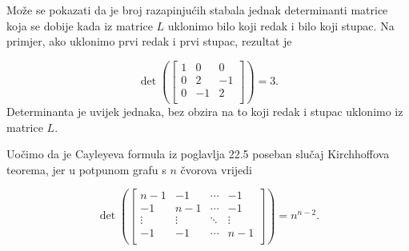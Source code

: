 Može se pokazati da je
broj razapinjućih stabala jednak
determinanti matrice koja se dobije
kada iz matrice $L$ uklonimo bilo koji redak i bilo koji stupac.
Na primjer, ako uklonimo prvi redak
i prvi stupac, rezultat je

\[ \det(
\begin{bmatrix}
  1 & 0 & 0 \\
  0 & 2 & -1 \\
  0 & -1 & 2 \\
 \end{bmatrix}
) =3.\]
Determinanta je uvijek jednaka,
bez obzira na to koji redak i stupac uklonimo iz matrice $L$.

Uočimo da je Cayleyeva formula iz poglavlja 22.5
poseban slučaj Kirchhoffova teorema,
jer u potpunom grafu s $n$ čvorova vrijedi

\[ \det(
\begin{bmatrix}
  n-1 & -1 & \cdots & -1 \\
  -1 & n-1 & \cdots & -1 \\
  \vdots & \vdots & \ddots & \vdots \\
  -1 & -1 & \cdots & n-1 \\
 \end{bmatrix}
) =n^{n-2}.\]



